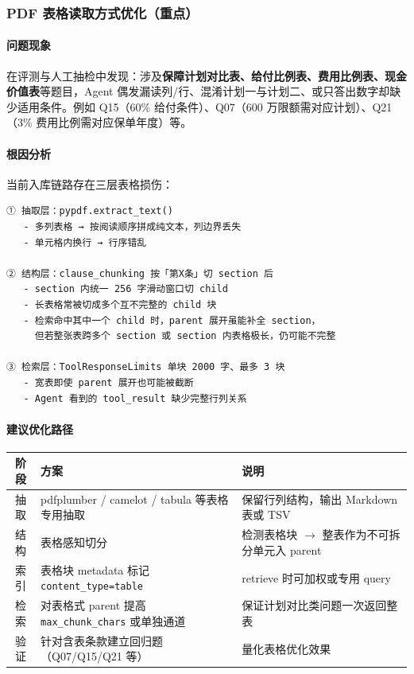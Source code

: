 \documentclass[11pt,a4paper]{ctexart}
\begin{document}
\subsubsection{PDF 表格读取方式优化（重点）}

\paragraph{问题现象}

在评测与人工抽检中发现：涉及\textbf{保障计划对比表、给付比例表、费用比例表、现金价值表}等题目，Agent 偶发漏读列/行、混淆计划一与计划二、或只答出数字却缺少适用条件。例如 Q15（60\% 给付条件）、Q07（600 万限额需对应计划）、Q21（3\% 费用比例需对应保单年度）等。

\paragraph{根因分析}

当前入库链路存在三层表格损伤：

\begin{lstlisting}
① 抽取层：pypdf.extract_text()
   - 多列表格 → 按阅读顺序拼成纯文本，列边界丢失
   - 单元格内换行 → 行序错乱

② 结构层：clause_chunking 按「第X条」切 section 后
   - section 内统一 256 字滑动窗口切 child
   - 长表格常被切成多个互不完整的 child 块
   - 检索命中其中一个 child 时，parent 展开虽能补全 section，
     但若整张表跨多个 section 或 section 内表格极长，仍可能不完整

③ 检索层：ToolResponseLimits 单块 2000 字、最多 3 块
   - 宽表即使 parent 展开也可能被截断
   - Agent 看到的 tool_result 缺少完整行列关系
\end{lstlisting}

\paragraph{建议优化路径}

\begin{center}
\begin{tabular}{clp{7cm}}
\toprule
\textbf{阶段} & \textbf{方案} & \textbf{说明} \\
\midrule
抽取 & pdfplumber / camelot / tabula 等表格专用抽取 & 保留行列结构，输出 Markdown 表或 TSV \\
结构 & 表格感知切分 & 检测表格块 $\rightarrow$ 整表作为不可拆分单元入 parent \\
索引 & 表格块 metadata 标记 \texttt{content\_type=table} & retrieve 时可加权或专用 query \\
检索 & 对表格式 parent 提高 \texttt{max\_chunk\_chars} 或单独通道 & 保证计划对比类问题一次返回整表 \\
验证 & 针对含表条款建立回归题（Q07/Q15/Q21 等） & 量化表格优化效果 \\
\bottomrule
\end{tabular}
\end{center}
\end{document}
